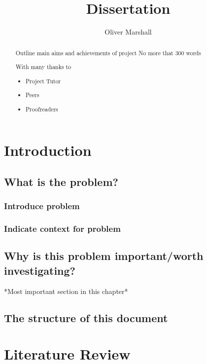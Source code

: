 \documentclass{report}
\begin{document}
% 

\title{Dissertation} \author{Oliver Marshall}
\maketitle
\newpage

\begin{abstract}
Outline main aims and achievements of project
No more that 300 words
\end{abstract}
\newpage

\renewcommand{\abstractname}{Acknowledgments}
\begin{abstract}
  With many thanks to
  \begin{itemize}
      \item Project Tutor
      \item Peers
      \item Proofreaders
  \end{itemize}
\end{abstract}
\newpage

\tableofcontents
\newpage

\chapter{Introduction}
\section{What is the problem?}
\subsection{Introduce problem}
\subsection{Indicate context for problem}
\section{Why is this problem important/worth investigating?}
*Most important section in this chapter*
\section{The structure of this document}

\chapter{Literature Review}
\end{document}
